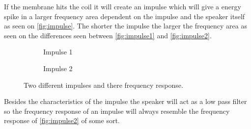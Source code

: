 
If the membrane hits the coil it will create an impulse which will give a energy spike in a larger frequency area dependent on the impulse and the speaker itself as seen on \autoref{fig:impulse}. The shorter the impulse the larger the frequency area as seen on the differences seen between \autoref{fig:impulse1} and \autoref{fig:impulse2}.  

\begin{figure}[H]
\begin{subfigure}[t]{0.47\textwidth}
\centering
{}
\scalebox{0.6}{
}
\caption{Impulse 1}
\label{fig:impulse1}
\end{subfigure}
\hspace{6mm} 
\begin{subfigure}[t]{0.47\textwidth}
\centering
{}
\scalebox{0.6}{
}
\caption{Impulse 2}
\label{fig:impulse2}
\end{subfigure}
\caption{Two different impulses and there frequency response.}
\label{fig:impulse}
\end{figure}
Besides the characteristics of the impulse the speaker will act as a low pass filter so the frequency response of an impulse will always resemble the frequency response of \autoref{fig:impulse2} of some sort.   


